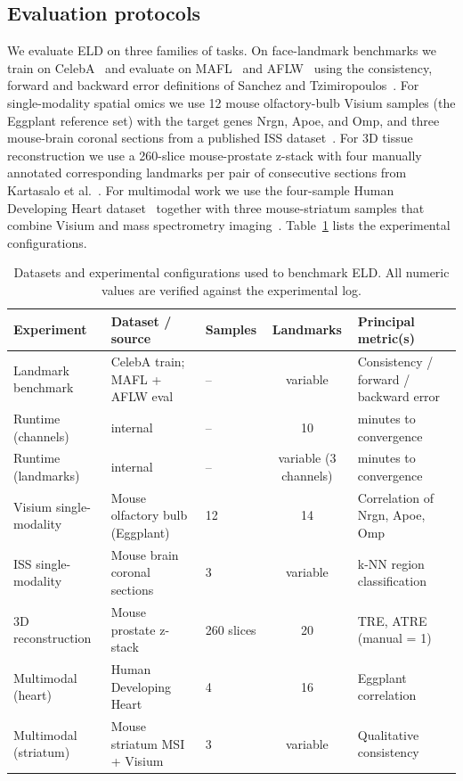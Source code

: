 \documentclass[11pt]{article}
\begin{document}
\subsection{Evaluation protocols}

We evaluate ELD on three families of tasks. On face-landmark benchmarks we train on CelebA~\cite{liu2015celeba} and evaluate on MAFL~\cite{zhang2016learning} and AFLW~\cite{kostinger2011aflw} using the consistency, forward and backward error definitions of Sanchez and Tzimiropoulos~\cite{sanchez2019object}. For single-modality spatial omics we use 12 mouse olfactory-bulb Visium samples (the Eggplant reference set) with the target genes Nrgn, Apoe, and Omp, and three mouse-brain coronal sections from a published ISS dataset~\cite{salas2022optimal}. For 3D tissue reconstruction we use a 260-slice mouse-prostate z-stack with four manually annotated corresponding landmarks per pair of consecutive sections from Kartasalo et al.~\cite{kartasalo2018comparative}. For multimodal work we use the four-sample Human Developing Heart dataset~\cite{asp2019spatiotemporal} together with three mouse-striatum samples that combine Visium and mass spectrometry imaging~\cite{vicari2024spatial}. Table~\ref{tab:datasets} lists the experimental configurations.

\begin{table}[htbp]
\centering
\caption{Datasets and experimental configurations used to benchmark ELD. All numeric values are verified against the experimental log.}
\label{tab:datasets}
\begin{tabular}{lllcl}
\toprule
Experiment & Dataset / source & Samples & Landmarks & Principal metric(s) \\
\midrule
Landmark benchmark & CelebA train; MAFL + AFLW eval~\cite{liu2015celeba,zhang2016learning,kostinger2011aflw} & -- & variable & Consistency / forward / backward error \\
Runtime (channels) & internal & -- & 10 & minutes to convergence \\
Runtime (landmarks) & internal & -- & variable (3 channels) & minutes to convergence \\
Visium single-modality & Mouse olfactory bulb (Eggplant) & 12 & 14 & Correlation of Nrgn, Apoe, Omp \\
ISS single-modality & Mouse brain coronal sections~\cite{salas2022optimal} & 3 & variable & k-NN region classification \\
3D reconstruction & Mouse prostate z-stack~\cite{kartasalo2018comparative} & 260 slices & 20 & TRE, ATRE (manual = 1) \\
Multimodal (heart) & Human Developing Heart~\cite{asp2019spatiotemporal} & 4 & 16 & Eggplant correlation \\
Multimodal (striatum) & Mouse striatum MSI + Visium~\cite{vicari2024spatial} & 3 & variable & Qualitative consistency \\
\bottomrule
\end{tabular}
\end{table}
\end{document}
